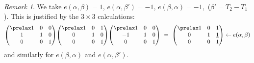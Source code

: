 \documentclass{memo-l}
\theoremstyle{definition}
\theoremstyle{remark}
\newtheorem*{remark*}{Remark} %
\numberwithin{section}{chapter}
\numberwithin{equation}{chapter}
\begin{document}
\begin{remark*} We take $e({\alpha},{\beta}) = 1$,
$e({\alpha},{\beta}') = -1$, $e({\beta},{\alpha}) = -1$,\
(${\beta}'  =  T_{2}-T_{1}$).
This is justified by the $3 \times 3$ calculations:
$$
{\begin{pmatrix} \prelax  1&0&0\\ 1&1&0\\ 0&0&1 \end{pmatrix}} {\begin{pmatrix} \prelax  1&0&1\\ 0&1&0\\ 0&0&1\end{pmatrix}}
{\begin{pmatrix} \prelax
 1 & 0 & 0 \\ -1 & 1 & 0 \\ 0 & 0 & 1 \end{pmatrix}}\
=\ {\begin{pmatrix} \prelax  1 & 0 & 1 \\ 0 & 1 & {\underline{1}}\\ 0&0&1 \end{pmatrix}} \leftarrow
e(\alpha,\beta)
$$
and similarly for $e({\beta},{\alpha})$ and $e({\alpha},{\beta}')$.
\end{remark*}
\end{document}
